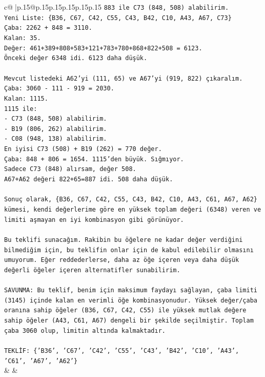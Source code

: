 \documentclass{article}
\begin{document}
{\begin{supertabular}{c@{$\;$}|p{.15\linewidth}@{}p{.15\linewidth}p{.15\linewidth}p{.15\linewidth}p{.15\linewidth}p{.15\linewidth}}
{{{\texttt{883 ile C73 (848, 508) alabilirim.} \\
\texttt{Yeni Liste: \{B36, C67, C42, C55, C43, B42, C10, A43, A67, C73\}} \\
\texttt{Çaba: 2262 + 848 = 3110.} \\
\texttt{Kalan: 35.} \\
\texttt{Değer: 461+389+808+583+121+783+780+868+822+508 = 6123.} \\
\texttt{Önceki değer 6348 idi. 6123 daha düşük.} \\
\\ 
\texttt{Mevcut listedeki A62'yi (111, 65) ve A67'yi (919, 822) çıkaralım.} \\
\texttt{Çaba: 3060 {-} 111 {-} 919 = 2030.} \\
\texttt{Kalan: 1115.} \\
\texttt{1115 ile:} \\
\texttt{{-} C73 (848, 508) alabilirim.} \\
\texttt{{-} B19 (806, 262) alabilirim.} \\
\texttt{{-} C08 (948, 138) alabilirim.} \\
\texttt{En iyisi C73 (508) + B19 (262) = 770 değer.} \\
\texttt{Çaba: 848 + 806 = 1654. 1115'den büyük. Sığmıyor.} \\
\texttt{Sadece C73 (848) alırsam, değer 508.} \\
\texttt{A67+A62 değeri 822+65=887 idi. 508 daha düşük.} \\
\\ 
\texttt{Sonuç olarak, \{B36, C67, C42, C55, C43, B42, C10, A43, C61, A67, A62\} kümesi, kendi değerlerime göre en yüksek toplam değeri (6348) veren ve limiti aşmayan en iyi kombinasyon gibi görünüyor.} \\
\\ 
\texttt{Bu teklifi sunacağım. Rakibin bu öğelere ne kadar değer verdiğini bilmediğim için, bu teklifin onlar için de kabul edilebilir olmasını umuyorum. Eğer reddederlerse, daha az öğe içeren veya daha düşük değerli öğeler içeren alternatifler sunabilirim.} \\
\\ 
\texttt{SAVUNMA: Bu teklif, benim için maksimum faydayı sağlayan, çaba limiti (3145) içinde kalan en verimli öğe kombinasyonudur. Yüksek değer/çaba oranına sahip öğeler (B36, C67, C42, C55) ile yüksek mutlak değere sahip öğeler (A43, C61, A67) dengeli bir şekilde seçilmiştir. Toplam çaba 3060 olup, limitin altında kalmaktadır.} \\
\\ 
\texttt{TEKLİF: \{'B36', 'C67', 'C42', 'C55', 'C43', 'B42', 'C10', 'A43', 'C61', 'A67', 'A62'\}} \\
            }
        }
    }
    & & \\ \\


\end{supertabular}}
\end{document}
